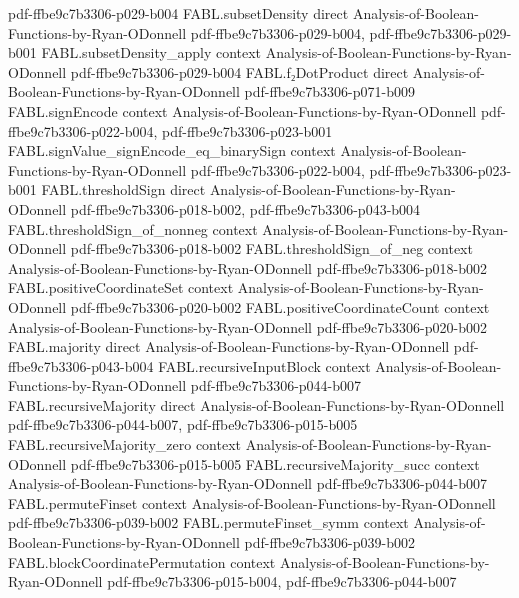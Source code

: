 \begin{theorem}
  {pdf-ffbe9c7b3306-p029-b004}
\proofstep
  {FABL.subsetDensity}
  {direct}
  {Analysis-of-Boolean-Functions-by-Ryan-ODonnell}
  {pdf-ffbe9c7b3306-p029-b004,
    pdf-ffbe9c7b3306-p029-b001}
\proofstep
  {FABL.subsetDensity_apply}
  {context}
  {Analysis-of-Boolean-Functions-by-Ryan-ODonnell}
  {pdf-ffbe9c7b3306-p029-b004}
\proofstep
  {FABL.f₂DotProduct}
  {direct}
  {Analysis-of-Boolean-Functions-by-Ryan-ODonnell}
  {pdf-ffbe9c7b3306-p071-b009}
\proofstep
  {FABL.signEncode}
  {context}
  {Analysis-of-Boolean-Functions-by-Ryan-ODonnell}
  {pdf-ffbe9c7b3306-p022-b004,
    pdf-ffbe9c7b3306-p023-b001}
\proofstep
  {FABL.signValue_signEncode_eq_binarySign}
  {context}
  {Analysis-of-Boolean-Functions-by-Ryan-ODonnell}
  {pdf-ffbe9c7b3306-p022-b004,
    pdf-ffbe9c7b3306-p023-b001}
\proofstep
  {FABL.thresholdSign}
  {direct}
  {Analysis-of-Boolean-Functions-by-Ryan-ODonnell}
  {pdf-ffbe9c7b3306-p018-b002,
    pdf-ffbe9c7b3306-p043-b004}
\proofstep
  {FABL.thresholdSign_of_nonneg}
  {context}
  {Analysis-of-Boolean-Functions-by-Ryan-ODonnell}
  {pdf-ffbe9c7b3306-p018-b002}
\proofstep
  {FABL.thresholdSign_of_neg}
  {context}
  {Analysis-of-Boolean-Functions-by-Ryan-ODonnell}
  {pdf-ffbe9c7b3306-p018-b002}
\proofstep
  {FABL.positiveCoordinateSet}
  {context}
  {Analysis-of-Boolean-Functions-by-Ryan-ODonnell}
  {pdf-ffbe9c7b3306-p020-b002}
\proofstep
  {FABL.positiveCoordinateCount}
  {context}
  {Analysis-of-Boolean-Functions-by-Ryan-ODonnell}
  {pdf-ffbe9c7b3306-p020-b002}
\proofstep
  {FABL.majority}
  {direct}
  {Analysis-of-Boolean-Functions-by-Ryan-ODonnell}
  {pdf-ffbe9c7b3306-p043-b004}
\proofstep
  {FABL.recursiveInputBlock}
  {context}
  {Analysis-of-Boolean-Functions-by-Ryan-ODonnell}
  {pdf-ffbe9c7b3306-p044-b007}
\proofstep
  {FABL.recursiveMajority}
  {direct}
  {Analysis-of-Boolean-Functions-by-Ryan-ODonnell}
  {pdf-ffbe9c7b3306-p044-b007,
    pdf-ffbe9c7b3306-p015-b005}
\proofstep
  {FABL.recursiveMajority_zero}
  {context}
  {Analysis-of-Boolean-Functions-by-Ryan-ODonnell}
  {pdf-ffbe9c7b3306-p015-b005}
\proofstep
  {FABL.recursiveMajority_succ}
  {context}
  {Analysis-of-Boolean-Functions-by-Ryan-ODonnell}
  {pdf-ffbe9c7b3306-p044-b007}
\proofstep
  {FABL.permuteFinset}
  {context}
  {Analysis-of-Boolean-Functions-by-Ryan-ODonnell}
  {pdf-ffbe9c7b3306-p039-b002}
\proofstep
  {FABL.permuteFinset_symm}
  {context}
  {Analysis-of-Boolean-Functions-by-Ryan-ODonnell}
  {pdf-ffbe9c7b3306-p039-b002}
\proofstep
  {FABL.blockCoordinatePermutation}
  {context}
  {Analysis-of-Boolean-Functions-by-Ryan-ODonnell}
  {pdf-ffbe9c7b3306-p015-b004,
    pdf-ffbe9c7b3306-p044-b007}

\end{theorem}
